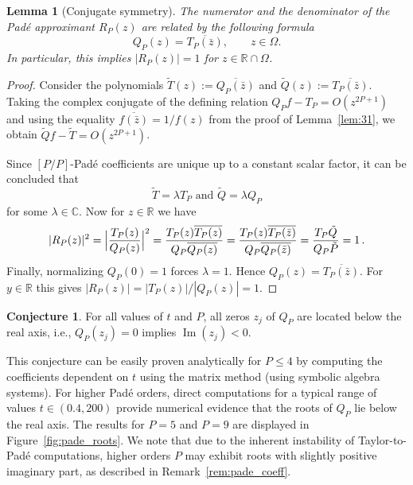 \documentclass[11pt,a4paper]{article}
\DeclareMathOperator{\Imag}{Im}
\theoremstyle{plain}%
\newtheorem{lemma}[thm]{Lemma}
\theoremstyle{definition}
\newtheorem{conjecture}{Conjecture}[section]
\theoremstyle{remark}
\begin{document}
\begin{lemma}[Conjugate symmetry]\label{lem:symm}
The numerator and the denominator of the Pad\'e approximant $R_P(z)$ are related by the following formula
\begin{equation*}
  Q_P(z) = \overline{T_P(\bar{z})}, \qquad z\in \Omega.
\end{equation*}
In particular, this implies $|R_P(z)|=1$ for  $z\in\mathbb{R}\cap \Omega$.
\end{lemma}
\begin{proof}
Consider the polynomials $\tilde{T}(z) := \overline{Q_P(\bar{z})}$ and
$\tilde{Q}(z) := \overline{T_P(\bar{z})}$.
Taking the complex conjugate of
the defining relation $Q_P f - T_P = O(z^{2P+1})$ and 
using the equality $\overline{f(\bar{z})}=1/f(z)$ from the proof of Lemma~\ref{lem:31}, we obtain $\tilde{Q} f - \tilde{T} = O(z^{2P+1})$. 

Since $[P/P]$-Pad\'e coefficients are unique up to a constant scalar factor, it can be concluded that
\begin{equation*}
  \tilde{T} = \lambda T_P  \text{ and } \tilde{Q} = \lambda Q_P
\end{equation*} 
for some $\lambda\in\mathbb{C}$. 
%
Now for $z\in \mathbb{R}$ we have
\begin{equation*} 
   |R_P(z)|^2 = \Bigl| \frac{T_P(z)}{Q_P(z)} \Bigr|^2 = \frac{T_P(z) \overline{T_P(z)}}{Q_P \overline{Q_P(z)}}= \frac{T_P(z) \overline{T_P(\bar{z})}}{Q_P \overline{Q_P(\bar{z})}} = \frac{T_P \tilde{Q}}{Q_P
   \tilde{P}} = 1\,.
\end{equation*}
Finally, normalizing $Q_P(0)=1$ forces $\lambda=1$. Hence
$Q_P(z)=\overline{T_P(\bar{z})}$. For $y\in\mathbb{R}$ this gives $|R_P(z)| = |T_P(z)|/|Q_P(z)| = 1$.
\end{proof}

\begin{conjecture}\label{conj1}
    For all values of $t$ and $P$, all zeros $z_j$ of $Q_P$ are located below the real axis, i.e., $Q_P(z_j)=0$ implies $\Imag(z_j)<0$.
\end{conjecture}

This conjecture can be easily proven analytically for $P\le4$ by computing the coefficients dependent on $t$ using the matrix method (using symbolic algebra systems).
For higher Pad\'e orders, direct computations for a typical range of values $t\in(0.4,200)$ provide numerical evidence that the roots of $Q_P$ lie below the real axis. 
The results for $P=5$ and $P=9$ are displayed in Figure~\ref{fig:pade_roots}. 
We note that due to the inherent instability of Taylor-to-Pad\'e computations, higher orders $P$ may exhibit roots with slightly positive imaginary part, as described in Remark~\ref{rem:pade_coeff}.
\end{document}

